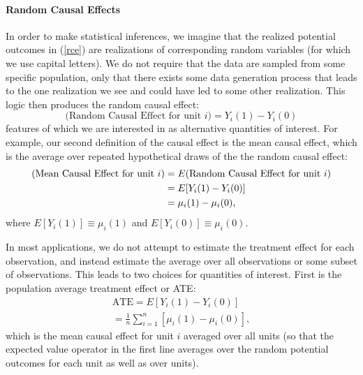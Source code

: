 \documentclass[11pt,titlepage]{article}
\begin{document}
\paragraph{Random Causal Effects} In order to make statistical
inferences, we imagine that the realized potential outcomes in
(\ref{rce}) are realizations of corresponding random variables (for
which we use capital letters).  We do not require that the data are
sampled from some specific population, only that there exists some
data generation process that leads to the one realization we see and
could have led to some other realization.  This logic then produces the
random causal effect:
\begin{equation}
  \label{rance}
  \text{(Random Causal Effect for unit $i$)}  = Y_i(1) - Y_i(0)
\end{equation}
features of which we are interested in as alternative quantities of
interest.  For example, our second definition of the causal effect is
the mean causal effect, which is the average over repeated
hypothetical draws of the the random causal effect:
\begin{align}
  \label{meance}
  \text{(Mean Causal Effect for unit $i$)}
  &= E(\text{Random Causal Effect for unit $i$})\\ 
  &= E[Y_i(1) - Y_i(0)]\\ \notag
  &= \mu_i(1) - \mu_i(0),
\end{align}
where $E[Y_i(1)]\equiv\mu_i(1)$ and $E[Y_i(0)]\equiv\mu_i(0)$.

In most applications, we do not attempt to estimate the treatment
effect for each observation, and instead estimate the average over all
observations or some subset of observations.  This leads to two
choices for quantities of interest.  First is the population average
treatment effect or ATE:
\begin{align}
  \label{pate}
  \text{ATE} = E[Y_i(1) - Y_i(0)] \\
             = \frac{1}{n}\sum_{i=1}^n[\mu_i(1) - \mu_i(0)],
\end{align}
which is the mean causal effect for unit $i$ averaged over all units
(so that the expected value operator in the first line averages over
the random potential outcomes for each unit as well as over units).
\end{document}
